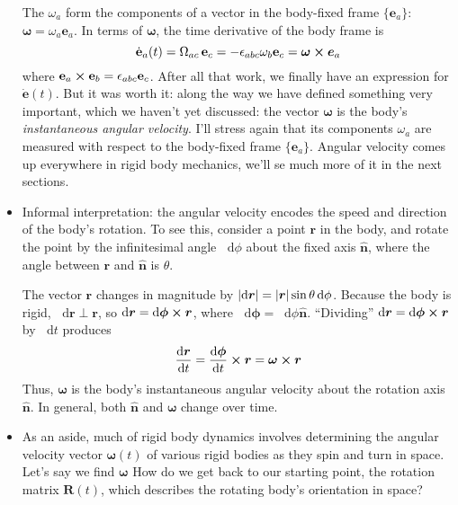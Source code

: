 \documentclass[11pt, a4paper]{article}
\newcommand{\diff}{\mathop{}\!\mathrm{d}} %
\newcommand{\e}{\mathbf{e}} %
\newcommand{\mat}[1]{\mathbf{#1}} %
\newcommand{\uvec}[1]{\bm{\hat{\mathbf{#1}}}} %
\begin{document}
\begin{itemize}
	The $ \omega_{a} $ form the components of a vector in the body-fixed frame $ \{\e_{a} \} $: $ \bm{\omega} = \omega_{a} \e_{a} $.  In terms of $ \bm{\omega} $, the time derivative of the body frame is
	\begin{equation*}
		\dot{\e}_{a}(t) = \operatorname{\Omega}_{ac} \e_{c} = - \epsilon_{abc} \omega_{b} \e_{c} = \bm{\omega} \cross \bm{e}_{a}
	\end{equation*}
	where $ \e_{a} \cross \e_{b} = \epsilon_{abc} \e_{c} $. After all that work, we finally have an expression for $ \dot{\e}(t) $. But it was worth it: along the way we have defined something very important, which we haven't yet discussed: the vector $ \bm{\omega} $ is the body's \textit{instantaneous angular velocity}. I'll stress again that its components $\omega_{a}$ are measured with respect to the body-fixed frame $ \{\e_{a} \} $. Angular velocity comes up everywhere in rigid body mechanics, we'll se much more of it in the next sections.
	
	\item Informal interpretation: the angular velocity encodes the speed and direction of the body's rotation. To see this, consider a point $ \bm{r} $ in the body, and rotate the point by the infinitesimal angle $ \diff \phi $ about the fixed axis $ \uvec{n} $, where the angle between $ \bm{r} $ and $ \uvec{n} $ is $ \theta $.
	
	The vector $ \bm{r} $ changes in magnitude by $ \abs{\diff \bm{r}} = \abs{\bm{r}} \sin \theta \diff \phi $. Because the body is rigid, $ \diff \bm{r} \perp \bm{r}$, so $ \diff \bm{r} = \diff \bm{\phi} \cross \bm{r} $, where $ \diff \bm{\phi} = \diff \phi \uvec{n} $. ``Dividing'' $ \diff \bm{r} = \diff \bm{\phi} \cross \bm{r} $ by $ \diff t $ produces
	\begin{equation*}
		\dv{\bm{r}}{t} = \dv{\bm{\phi}}{t} \cross \bm{r} = \bm{\omega} \cross \bm{r}
	\end{equation*}
	Thus, $ \bm{\omega} $ is the body's instantaneous angular velocity about the rotation axis $ \uvec{n} $. In general, both $ \uvec{n} $ and $ \bm{\omega} $ change over time.

	\item As an aside, much of rigid body dynamics involves determining the angular velocity vector $ \bm{\omega}(t) $ of various rigid bodies as they spin and turn in space. Let's say we find $ \bm{\omega} $ How do we get back to our starting point, the rotation matrix $ \mat{R}(t) $, which describes the rotating body's orientation in space?
	

\end{itemize}
\end{document}
